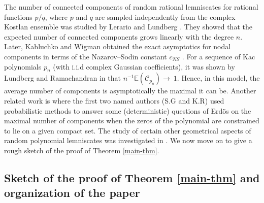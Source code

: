 \documentclass[9pt,a4paper,reqno]{amsart}
\newcommand{\E}{{\mathbb{E}}}
\theoremstyle{mine}
\newtheorem{remark}[thm]{Remark}
\theoremstyle{definition}
\theoremstyle{remark}
\begin{document}
The number of connected components of random rational lemniscates for rational functions $p/q$, where \(p\) and \(q\) are sampled independently from the complex Kostlan ensemble was studied by Lerario and Lundberg \cite{lerario-lundberg-PLMS16}. They showed that the expected number of connected components grows linearly with the degree \(n\). Later, Kabluchko and Wigman \cite{Kabluchko-Wigman} obtained the exact asymptotics for nodal components in terms of the Nazarov--Sodin constant $c_{NS}$ \cite{Nazarov-Sodin}. For a sequence of Kac polynomials $p_n$ (with i.i.d complex Gaussian coefficients), it was shown by Lundberg and Ramachandran in \cite{lundberg-ramachandran-JLMS17} that $n^{-1}\E(\mathscr{C}_{p_n})\to\ 1$. Hence, in this model, the average number of components is asymptotically the maximal it can be. Another related work is \cite{GhoshRamachandran} where the first two named authors (S.G and K.R) used probabilistic methods to answer some (deterministic) questions of Erd\"{o}s on the maximal number of components when the zeros of the polynomial are constrained to lie on a given compact set. The study of certain other geometrical aspects of random polynomial lemniscates was investigated in \cite{KLR}. We now move on to give a rough sketch of the proof of Theorem \ref{main-thm}.
 



\subsection{Sketch of the proof of Theorem \ref{main-thm} and organization of the paper}\label{sketch}
\end{document}
